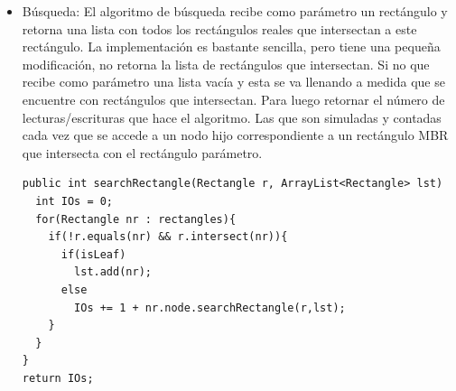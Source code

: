 \documentclass[letterpaper,12pt]{article}
\begin{document}
\begin{itemize}
\item B\'usqueda: El algoritmo de b\'usqueda recibe como par\'ametro un rect\'angulo y retorna una lista con todos los rect\'angulos reales que intersectan a este rect\'angulo. La implementaci\'on es bastante sencilla, pero tiene una pequeña modificaci\'on, no retorna la lista de rect\'angulos que intersectan. Si no que recibe como par\'ametro una lista vac\'ia y esta se va llenando a medida que se encuentre con rect\'angulos que intersectan. Para luego retornar el n\'umero de lecturas/escrituras que hace el algoritmo. Las que son simuladas y contadas cada vez que se accede a un nodo hijo correspondiente a un rect\'angulo MBR que intersecta con el rect\'angulo par\'ametro.
\lstset{language=Java, breaklines=true, basicstyle=\footnotesize}
\begin{lstlisting}[frame=single]
public int searchRectangle(Rectangle r, ArrayList<Rectangle> lst)
  int IOs = 0;
  for(Rectangle nr : rectangles){
    if(!r.equals(nr) && r.intersect(nr)){
      if(isLeaf)
        lst.add(nr);
      else
        IOs += 1 + nr.node.searchRectangle(r,lst);
    }
  }
}
return IOs;
\end{lstlisting}

\end{itemize}
\end{document}
